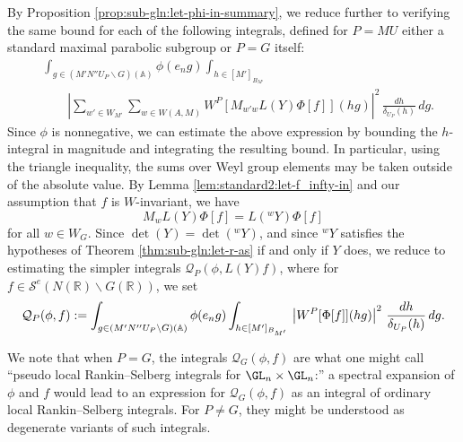 By Proposition \ref{prop:sub-gln:let-phi-in-summary}, we reduce further to verifying the same bound for each of the following integrals, defined for $P = MU$ either a standard maximal parabolic subgroup or $P = G$ itself:
\begin{align*}
  &\int_{g \in (M' N'' {U_P} \backslash G)(\mathbb{A}) } \phi(e_n g)
    \int_{h \in [M']_{B_{M'}}} \\
  &\quad  \quad
    \left\lvert
    \sum_{w' \in W_{M'}}
    \sum_{w \in W(A,M)}
    W^P[M_{w' w} L(Y) \Phi[f]](h g)
    \right\rvert^2
    \, \frac{d h}{\delta_{U_P}(h)}
    \, d g.
\end{align*}
Since $\phi$ is nonnegative, we can estimate the above expression by bounding the $h$-integral in magnitude and integrating the resulting bound.  In particular, using the triangle inequality, the sums over Weyl group elements may be taken outside of the absolute value.  By Lemma \ref{lem:standard2:let-f_infty-in} and our assumption that $f$ is $W$-invariant, we have
\begin{equation*}
  M_{w} L(Y) \Phi[f] = L({}^w Y) \Phi[f]
\end{equation*}
for all $w \in W_G$.  Since $\det(Y) = \det({}^w Y)$, and since ${}^w Y$ satisfies the hypotheses of Theorem \ref{thm:sub-gln:let-r-as} if and only if $Y$ does, we reduce to estimating the simpler integrals $\mathcal{Q}_P(\phi, L(Y) f)$, where for $f \in \mathcal{S}^e(N(\mathbb{R}) \backslash G(\mathbb{R}))$, we set
\begin{equation}\label{eq:mathcalq_pphi-f-:=}
  \mathcal{Q}_P(\phi, f)
  :=
  \int_{g \in (M' N'' {U_P} \backslash G)(\mathbb{A}) } \phi(e_n g)
  \int_{h \in [M']_{B_{M'}}} \\
  \left\lvert
    W^P[\Phi[f]](h g)
  \right\rvert^2
  \, \frac{d h}{\delta_{U_P}(h)}
  \, d g.
\end{equation}

We note that when $P = G$, the integrals $\mathcal{Q}_G(\phi,f)$ are what one might call ``pseudo local Rankin--Selberg integrals for $\GL_n \times \GL_n$:'' a spectral expansion of $\phi$ and $f$ would lead to an expression for $\mathcal{Q}_G(\phi,f)$ as an integral of ordinary local Rankin--Selberg integrals.  For $P \neq G$, they might be understood as degenerate variants of such integrals.

